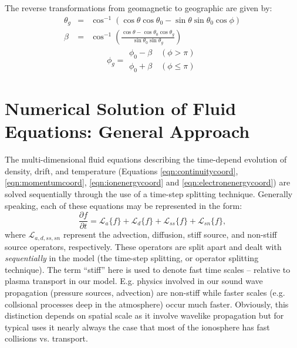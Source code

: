 \documentclass[11pt,letterpaper]{article}
\begin{document}
The reverse transformations from geomagnetic to geographic are given by:  
\begin{eqnarray}
\theta_g &=& \cos^{-1} \left( \cos \theta \cos \theta_0 - \sin \theta \sin \theta_0 \cos \phi \right) \\
\beta &=& \cos^{-1} \left( \frac{\cos \theta - \cos \theta_0 \cos \theta_g}{\sin \theta_0 \sin \theta_g} \right)
\end{eqnarray}
\begin{equation}
\phi_g= 
\begin{array}{c}
\phi_0 - \beta \quad (\phi > \pi) \\
\phi_0 + \beta \quad (\phi \le \pi)
\end{array}
\end{equation}



\section{Numerical Solution of Fluid Equations:  General Approach}

The multi-dimensional fluid equations describing the time-depend evolution of density, drift, and temperature (Equations \ref{eqn:continuitycoord}, \ref{eqn:momentumcoord}, \ref{eqn:ionenergycoord} and \ref{eqn:electronenergycoord}) are solved sequentially through the use of a time-step splitting technique.  Generally speaking, each of these equations may be represented in the form:
\begin{equation}
\frac{\partial f}{\partial t} = \mathcal{L}_a \{f\} + \mathcal{L}_d \{f\} + \mathcal{L}_{ss} \{f\} + \mathcal{L}_{sn} \{f\}, \label{eqn:fulltransport}
\end{equation}
where $\mathcal{L}_{a,d,ss,sn}$ represent the advection, diffusion, stiff source, and non-stiff source operators, respectively.  These operators are split apart and dealt with \emph{sequentially} in the model (the time-step splitting, or operator splitting technique).  The term ``stiff'' here is used to denote fast time scales -- relative to plasma transport in our model.  E.g. physics involved in our sound wave propagation (pressure sources, advection) are non-stiff while faster scales (e.g. collsional processes deep in the atmosphere) occur much faster.  Obviously, this distinction depends on spatial scale as it involve wavelike propagation but for typical uses it nearly always the case that most of the ionosphere has fast collisions vs. transport.  
\end{document}
